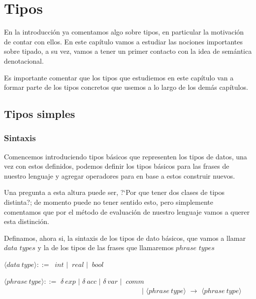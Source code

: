 \chapter{Tipos}
\label{chap:types}

En la introducci\'on ya comentamos algo sobre tipos, en particular la 
motivaci\'on de contar con ellos. En este cap\'itulo vamos a estudiar las 
nociones importantes sobre tipado, a su vez, vamos a tener un primer contacto
con la idea de sem\'antica denotacional. \

Es importante comentar que los tipos que estudiemos en este cap\'itulo van
a formar parte de los tipos concretos que usemos a lo largo de los dem\'as
cap\'itulos.


\section{Tipos simples}

\subsection{Sintaxis}
Comencemos introduciendo tipos b\'asicos que representen los tipos de datos,
una vez con estos definidos, podemos definir los tipos b\'asicos para las
frases de nuestro lenguaje y agregar operadores para en base a estos
construir nuevos.\

Una pregunta a esta altura puede ser, ?`Por que tener dos clases de tipos 
distinta?; de momento puede no tener sentido esto, pero simplemente
comentamos que por el m\'etodo de evaluaci\'on de nuestro lenguaje
vamos a querer esta distinci\'on.\

Definamos, ahora si, la sintaxis de los tipos de dato b\'asicos, 
que vamos a llamar $data$ $types$ y la de los tipos de las frases que
llamaremos $phrase$ $types$ 

\begin{center} $\langle data \ type \rangle ::=$ ${\ int}$ $|$ ${\ real}$ $|$ ${\ bool}$ \end{center}

\begin{center} 
$\langle phrase \ type \rangle ::=$ $\delta {\ exp}$ $|$ $\delta {\ acc}$ $|$ $\delta {\ var}$ $|$ ${\ comm}$ \\

\ \ \ \ \ \ \ \ \ \ \ \ \ \ \ \ \ \ 
\ \ \ \ \ \ \ \ \ \ \ \ \ \ \ \ \ \ 
\ \ \ \ 
$|$ $\langle phrase \ type \rangle$ $\rightarrow$ $\langle phrase \ type \rangle$
\end{center}

